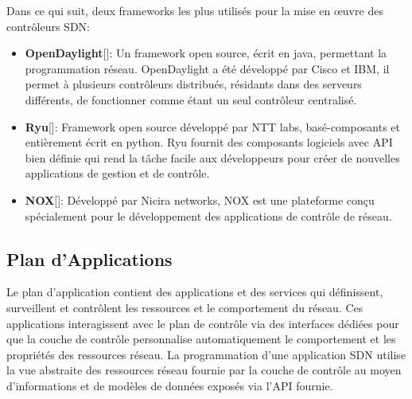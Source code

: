 \noindent Dans ce qui suit, deux frameworks les plus utilisés pour la mise en œuvre des contrôleurs SDN:\\
\begin{itemize}
\item[]\textbf{OpenDaylight}[\cite{3}]: Un framework open source, écrit en java, permettant la programmation réseau. OpenDaylight a été développé par Cisco et IBM, il permet à plusieurs contrôleurs distribués, résidants dans des serveurs différents, de fonctionner comme étant un seul contrôleur centralisé.\\
\item[]\textbf{Ryu}[\cite{4}]: Framework open source développé par NTT labs, basé-composants et entièrement écrit en python. Ryu fournit des composants logiciels avec API bien définie qui rend la tâche facile aux développeurs pour créer de nouvelles applications de gestion et de contrôle.\\
\item[]\textbf{NOX}[\cite{5}]: Développé par Nicira networks, NOX est une plateforme conçu spécialement pour le développement des applications de contrôle de réseau.
\end{itemize} 

\newpage
\subsection{Plan d'Applications}
Le plan d’application contient des applications et des services qui définissent, surveillent et contrôlent les ressources et le comportement du réseau. Ces applications interagissent avec le plan de contrôle via des interfaces dédiées pour que la couche de contrôle personnalise automatiquement le comportement et les propriétés des ressources réseau. La programmation d’une application SDN utilise la vue abstraite des ressources réseau fournie par la couche de contrôle au moyen d’informations et de modèles de données exposés via l’API fournie.

